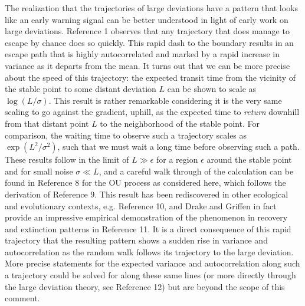\documentclass[review]{elsarticle} %
\begin{document}
The realization that the trajectories of large deviations have a pattern
that looks like an early warning signal can be better understood in
light of early work on large deviations. Reference 1 observes that any
trajectory that does manage to escape by chance does so quickly. This
rapid dash to the boundary results in an escape path that is highly
autocorrelated and marked by a rapid increase in variance as it departs
from the mean. It turns out that we can be more precise about the speed
of this trajectory: the expected transit time from the vicinity of the
stable point to some distant deviation $L$ can be shown to scale as
$\log(L/\sigma)$. This result is rather remarkable considering it is the
very same scaling to go against the gradient, uphill, as the expected
time to \emph{return} downhill from that distant point $L$ to the
neighborhood of the stable point. For comparison, the waiting time to
observe such a trajectory scales as $\exp(L^2/\sigma^2)$, such that we
must wait a long time before observing such a path. These results follow
in the limit of $L \gg \epsilon$ for a region $\epsilon$ around the
stable point and for small noise $\sigma \ll L$, and a careful walk
through of the calculation can be found in Reference 8 for the OU
process as considered here, which follows the derivation of Reference 9.
This result has been rediscovered in other ecological and evolutionary
contexts, e.g. Reference 10, and Drake and Griffen in fact provide an
impressive empirical demonstration of the phenomenon in recovery and
extinction patterns in Reference 11. It is a direct consequence of this
rapid trajectory that the resulting pattern shows a sudden rise in
variance and autocorrelation as the random walk follows its trajectory
to the large deviation. More precise statements for the expected
variance and autocorrelation along such a trajectory could be solved for
along these same lines (or more directly through the large deviation
theory, see Reference 12) but are beyond the scope of this comment.
\end{document}
